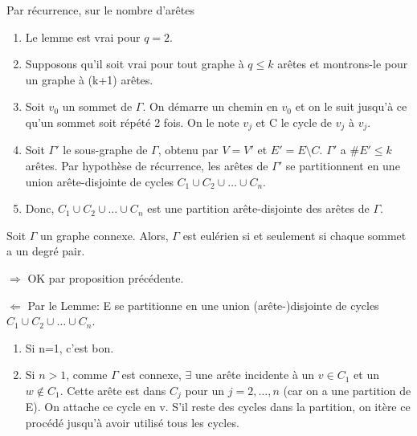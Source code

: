 \newpage

\begin{demo}
Par récurrence, sur le nombre d'arêtes
	\begin{enumerate}
		\item Le lemme est vrai pour $q=2$.
		\item Supposons qu'il soit vrai pour tout graphe à $q \leq k$ arêtes et montrons-le pour un graphe à (k+1) arêtes.
		\item Soit $v_{0}$ un sommet de $\Gamma$. On démarre un chemin en $v_{0}$ et on le suit jusqu'à ce qu'un sommet soit répété 2 fois. On le note $v_{j}$ et C le cycle de $v_{j}$ à $v_{j}$.
		\item Soit ${\Gamma}'$ le sous-graphe de $\Gamma$, obtenu par $V={V}'$ et ${E}'=E \setminus C$. ${\Gamma}'$ a $\#{E}' \leq k$ arêtes. Par hypothèse de récurrence, les arêtes de ${\Gamma}'$ se partitionnent en une union arête-disjointe de cycles $C_{1} \cup C_{2} \cup \ldots \cup C_{n}$.
		\item Donc, $C_{1} \cup C_{2} \cup \ldots \cup C_{n}$ est une partition arête-disjointe des arêtes de $\Gamma$.
	\end{enumerate}
\end{demo}

\begin{thrm}[\textcolor{red}{ATTENTION! Ce théorème et sa démonstration font partie de ceux à connaitre par coeur à l'examen! (pour l'année 2015-2016)}]
Soit $\Gamma$ un graphe connexe. Alors, $\Gamma$ est eulérien si et seulement si chaque sommet a un degré pair.
\end{thrm}

\begin{demo}
$\Rightarrow$ OK par proposition précédente.

\hspace{-0.60cm}$\Leftarrow$ Par le Lemme: E se partitionne en une union (arête-)disjointe de cycles $C_{1} \cup C_{2} \cup \ldots \cup C_{n}$.
	\begin{enumerate}
		\item Si n=1, c'est bon.
		\item Si $n>1$, comme $\Gamma$ est connexe, $\exists$ une arête incidente à un $v \in C_{1}$ et un $w \notin C_{1}$. Cette arête est dans $C_{j}$ pour un $j=2,\ldots,n$ (car on a une partition de E). On attache ce cycle en v. S'il reste des cycles dans la partition, on itère ce procédé jusqu'à avoir utilisé tous les cycles.
	\end{enumerate}
\end{demo}


